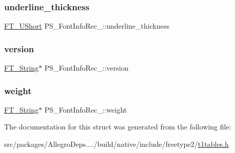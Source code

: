 \subsubsection{\texorpdfstring{underline\+\_\+thickness}{underline\_thickness}}
{\footnotesize\ttfamily \hyperlink{fttypes_8h_a937f6c17cf5ffd09086d8610c37b9f58}{F\+T\+\_\+\+U\+Short} P\+S\+\_\+\+Font\+Info\+Rec\+\_\+\+::underline\+\_\+thickness}

\mbox{\label{struct_p_s___font_info_rec___adb595076e50f8e7ece9446f612433cfc}} 
\subsubsection{\texorpdfstring{version}{version}}
{\footnotesize\ttfamily \hyperlink{fttypes_8h_a9846214585359eb2ba6bbb0e6de30639}{F\+T\+\_\+\+String}$\ast$ P\+S\+\_\+\+Font\+Info\+Rec\+\_\+\+::version}

\mbox{\label{struct_p_s___font_info_rec___a057243ec7cf62f573fa675ccb728f4b1}} 
\subsubsection{\texorpdfstring{weight}{weight}}
{\footnotesize\ttfamily \hyperlink{fttypes_8h_a9846214585359eb2ba6bbb0e6de30639}{F\+T\+\_\+\+String}$\ast$ P\+S\+\_\+\+Font\+Info\+Rec\+\_\+\+::weight}



The documentation for this struct was generated from the following file\+:\begin{DoxyCompactItemize}
\item 
src/packages/\+Allegro\+Deps..../build/native/include/freetype2/\hyperlink{t1tables_8h}{t1tables.\+h}\end{DoxyCompactItemize}
